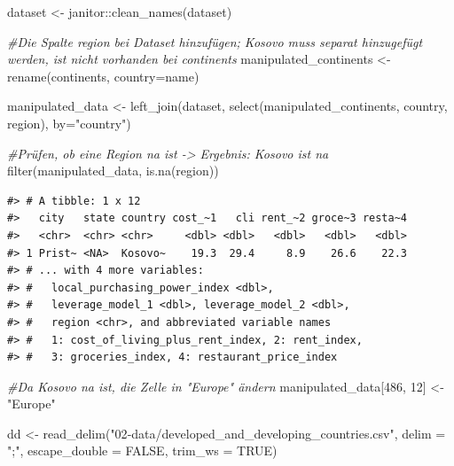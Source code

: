 \documentclass[
  11pt,
  a4paper,
  twoside]{scrbook}
\newenvironment{Shaded}{\begin{snugshade}}{\end{snugshade}}
\newcommand{\AttributeTok}[1]{\textcolor[rgb]{0.77,0.63,0.00}{#1}}
\newcommand{\CommentTok}[1]{\textcolor[rgb]{0.56,0.35,0.01}{\textit{#1}}}
\newcommand{\ConstantTok}[1]{\textcolor[rgb]{0.00,0.00,0.00}{#1}}
\newcommand{\DecValTok}[1]{\textcolor[rgb]{0.00,0.00,0.81}{#1}}
\newcommand{\FunctionTok}[1]{\textcolor[rgb]{0.00,0.00,0.00}{#1}}
\newcommand{\NormalTok}[1]{#1}
\newcommand{\OtherTok}[1]{\textcolor[rgb]{0.56,0.35,0.01}{#1}}
\newcommand{\SpecialCharTok}[1]{\textcolor[rgb]{0.00,0.00,0.00}{#1}}
\newcommand{\StringTok}[1]{\textcolor[rgb]{0.31,0.60,0.02}{#1}}
\begin{document}
\linespread{1}

\begin{Shaded}
\begin{Highlighting}[]

\NormalTok{dataset }\OtherTok{\textless{}{-}}\NormalTok{ janitor}\SpecialCharTok{::}\FunctionTok{clean\_names}\NormalTok{(dataset)}

\CommentTok{\#Die Spalte region bei Dataset hinzufügen; Kosovo muss separat hinzugefügt werden, ist nicht vorhanden bei continents}
\NormalTok{manipulated\_continents }\OtherTok{\textless{}{-}} \FunctionTok{rename}\NormalTok{(continents, }\AttributeTok{country=}\NormalTok{name)}

\NormalTok{manipulated\_data }\OtherTok{\textless{}{-}} \FunctionTok{left\_join}\NormalTok{(dataset, }\FunctionTok{select}\NormalTok{(manipulated\_continents, country, region), }\AttributeTok{by=}\StringTok{"country"}\NormalTok{)}

\CommentTok{\#Prüfen, ob eine Region na ist {-}\textgreater{} Ergebnis: Kosovo ist na}
\FunctionTok{filter}\NormalTok{(manipulated\_data, }\FunctionTok{is.na}\NormalTok{(region))}
\end{Highlighting}
\end{Shaded}

\linespread{1}

\begin{verbatim}
#> # A tibble: 1 x 12
#>   city   state country cost_~1   cli rent_~2 groce~3 resta~4
#>   <chr>  <chr> <chr>     <dbl> <dbl>   <dbl>   <dbl>   <dbl>
#> 1 Prist~ <NA>  Kosovo~    19.3  29.4     8.9    26.6    22.3
#> # ... with 4 more variables:
#> #   local_purchasing_power_index <dbl>,
#> #   leverage_model_1 <dbl>, leverage_model_2 <dbl>,
#> #   region <chr>, and abbreviated variable names
#> #   1: cost_of_living_plus_rent_index, 2: rent_index,
#> #   3: groceries_index, 4: restaurant_price_index
\end{verbatim}

\linespread{1}

\begin{Shaded}
\begin{Highlighting}[]
\CommentTok{\#Da Kosovo na ist, die Zelle in "Europe" ändern}
\NormalTok{manipulated\_data[}\DecValTok{486}\NormalTok{, }\DecValTok{12}\NormalTok{] }\OtherTok{\textless{}{-}} \StringTok{"Europe"}

\NormalTok{dd }\OtherTok{\textless{}{-}} \FunctionTok{read\_delim}\NormalTok{(}\StringTok{"02{-}data/developed\_and\_developing\_countries.csv"}\NormalTok{,}
                 \AttributeTok{delim =} \StringTok{";"}\NormalTok{, }\AttributeTok{escape\_double =} \ConstantTok{FALSE}\NormalTok{,}
                 \AttributeTok{trim\_ws =} \ConstantTok{TRUE}\NormalTok{)}
\end{Highlighting}
\end{Shaded}
\end{document}
